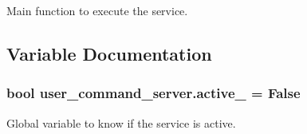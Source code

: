 Main function to execute the service. 



\subsection{Variable Documentation}
\subsubsection[{\texorpdfstring{active\+\_\+}{active_}}]{\setlength{\rightskip}{0pt plus 5cm}bool user\+\_\+command\+\_\+server.\+active\+\_\+ = False}\hypertarget{namespaceuser__command__server_ab82cb63aa559c128e8101fed0670b8b6}{}\label{namespaceuser__command__server_ab82cb63aa559c128e8101fed0670b8b6}


Global variable to know if the service is active. 

